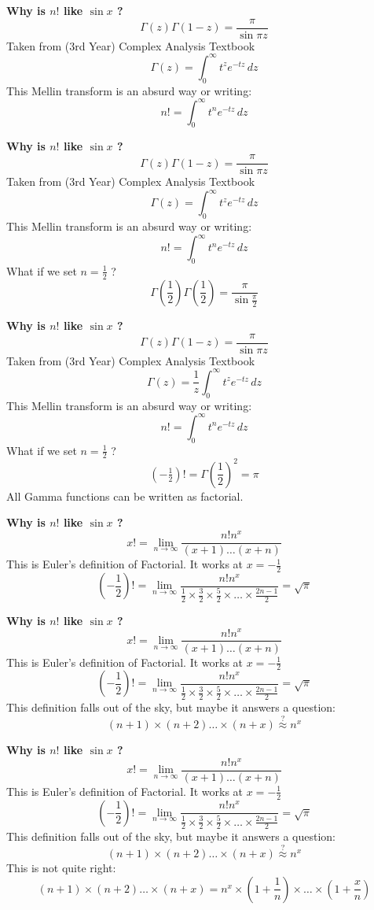\documentclass[12pt]{article}
\begin{document}
\newpage


\noindent \textbf{Why is $n!$ like $\sin x$ ?  }
$$ \Gamma(z) \Gamma(1-z) = \frac{\pi}{\sin \pi z}$$
Taken from (3rd Year) Complex Analysis Textbook
$$ \Gamma(z) = \int_0^\infty t^z e^{-tz} \, dz$$
This Mellin transform is an absurd way or writing:
$$ n! = \int_0^\infty t^n e^{-tz} \, dz$$


\newpage


\noindent \textbf{Why is $n!$ like $\sin x$ ?  }
$$ \Gamma(z) \Gamma(1-z) = \frac{\pi}{\sin \pi z}$$
Taken from (3rd Year) Complex Analysis Textbook
$$ \Gamma(z) = \int_0^\infty t^z e^{-tz} \, dz$$
This Mellin transform is an absurd way or writing:
$$ n! = \int_0^\infty t^n e^{-tz} \, dz$$
What if we set $n = \frac{1}{2}$ ?
$$  \Gamma \left(\frac{1}{2}\right)
\Gamma \left(\frac{1}{2}\right)
 = \frac{\pi}{\sin \frac{\pi}{2}}
$$

\newpage


\noindent \textbf{Why is $n!$ like $\sin x$ ?  }
$$ \Gamma(z) \Gamma(1-z) = \frac{\pi}{\sin \pi z}$$
Taken from (3rd Year) Complex Analysis Textbook
$$ \Gamma(z) = \frac{1}{z} \int_0^\infty t^z e^{-tz} \, dz$$
This Mellin transform is an absurd way or writing:
$$ n! = \int_0^\infty t^n e^{-tz} \, dz$$
What if we set $n = \frac{1}{2}$ ?
$$  
(- \tfrac{1}{2})! = \Gamma \left(\frac{1}{2}\right)^2
 = \pi 
$$
All Gamma functions can be written as factorial.

\newpage

\noindent \textbf{Why is $n!$ like $\sin x$ ?  }
$$ x! = \lim_{n \to \infty} \frac{n! n^x}{(x+1)\dots(x+n)} $$
This is Euler's definition of Factorial.  It works at $x = - \frac{1}{2}$
$$ (-\frac{1}{2})! = \lim_{n \to \infty} \frac{n! n^x}{ \frac{1}{2} \times \frac{3}{2} \times \frac{5}{2}\times \dots \times \frac{2n-1}{2}} = \sqrt{\pi} $$

\newpage

\noindent \textbf{Why is $n!$ like $\sin x$ ?  }
$$ x! = \lim_{n \to \infty} \frac{n! n^x}{(x+1)\dots(x+n)} $$
This is Euler's definition of Factorial.  It works at $x = - \frac{1}{2}$
$$ (-\frac{1}{2})! = \lim_{n \to \infty} \frac{n! n^x}{ \frac{1}{2} \times \frac{3}{2} \times \frac{5}{2}\times \dots \times \frac{2n-1}{2}} = \sqrt{\pi} $$
This definition falls out of the sky, but maybe it answers a question:
$$ (n+1)\times (n+2) \dots \times (n+x)
\stackrel{?}{\approx} n^x $$

\newpage

\noindent \textbf{Why is $n!$ like $\sin x$ ?  }
$$ x! = \lim_{n \to \infty} \frac{n! n^x}{(x+1)\dots(x+n)} $$
This is Euler's definition of Factorial.  It works at $x = - \frac{1}{2}$
$$ (-\frac{1}{2})! = \lim_{n \to \infty} \frac{n! n^x}{ \frac{1}{2} \times \frac{3}{2} \times \frac{5}{2}\times \dots \times \frac{2n-1}{2}} = \sqrt{\pi} $$
This definition falls out of the sky, but maybe it answers a question:
$$ (n+1)\times (n+2) \dots \times (n+x)
\stackrel{?}{\approx} n^x $$
This is not quite right:
$$ (n+1)\times (n+2) \dots \times (n+x)
= n^x \times (1 + \frac{1}{n}) \times \dots \times (1 + \frac{x}{n}) $$
\end{document}
